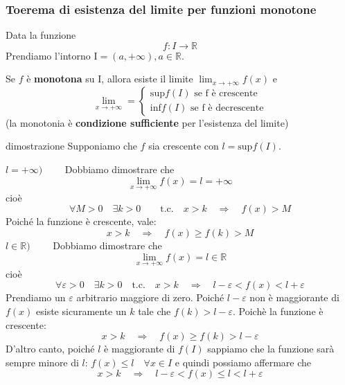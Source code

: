 \documentclass[x11names]{article}
\begin{document}
	\begin{center}
		\colorbox{myred}{\begin{minipage}{5.75in}
				\begin{redes}{}
					\subsubsection{Toerema di esistenza del limite per funzioni monotone}
					Data la funzione
					\[
					f: I \rightarrow \mathbb{R}
					\]
					Prendiamo l'intorno $\text{I} = (a,+\infty), a \in \mathbb{R}$.
					
					Se $f$ è \textbf{monotona} su $\text{I}$, allora esiste il limite $\lim_{x \to +\infty}f(x)$ e 
					\[
					\lim_{x \to +\infty} = 
					\begin{cases}
						\text{sup}f(I) \text{ se f è crescente}  \\
						\text{inf}f(I) \text{ se f è decrescente} 
					\end{cases}
					\]
					(la monotonia è \textbf{condizione sufficiente} per l'esistenza del limite)
				\end{redes}
		\end{minipage}}        
	\end{center}
	
	\begin{es}{dimostrazione}
		Supponiamo che $f$ sia crescente con $l = \text{sup}f(I)$.
		
		$l = + \infty\text{)} \qquad$ Dobbiamo dimostrare che
		\[
		\lim_{x \to + \infty}f(x) = l = + \infty
		\]
		cioè
		\[
		\forall M > 0 \quad \exists k > 0  \qquad \text{t.c.} \quad x > k  \quad \Longrightarrow \quad f(x) > M
		\]
		Poiché la funzione è crescente, vale:
		\[
		x > k \quad \Longrightarrow \quad f(x) \geq f(k) > M
		\]
		$l \in \mathbb{R} \text{)} \qquad$ Dobbiamo dimostrare che 
		\[
		\lim_{x \to + \infty}f(x) = l \in \mathbb{R}
		\]
		cioè
		\[
		\forall \varepsilon > 0 \quad \exists k > 0 \quad \text{t.c.} \quad x>k \quad \Longrightarrow \quad l -\varepsilon < f(x) < l + \varepsilon
		\]
		Prendiamo un $\varepsilon$ arbitrario maggiore di zero. Poiché $l-\varepsilon$ non è maggiorante di $f(x)$ esiste sicuramente un $k$ tale che $f(k) > l - \varepsilon$. Poichè la funzione è crescente:
		\[
		x > k \quad \Longrightarrow \quad f(x) \geq f(k) > l - \varepsilon
		\]
		D'altro canto, poiché $l$ è maggiorante di $f(I)$ sappiamo che la funzione sarà sempre minore di $l$: $f(x) \leq l \quad \forall x \in I$ e quindi possiamo affermare che
		\[
		x > k \quad \Longrightarrow \quad l - \varepsilon < f(x) \leq l < l + \varepsilon
		\]
	\end{es}
	
\end{document}
